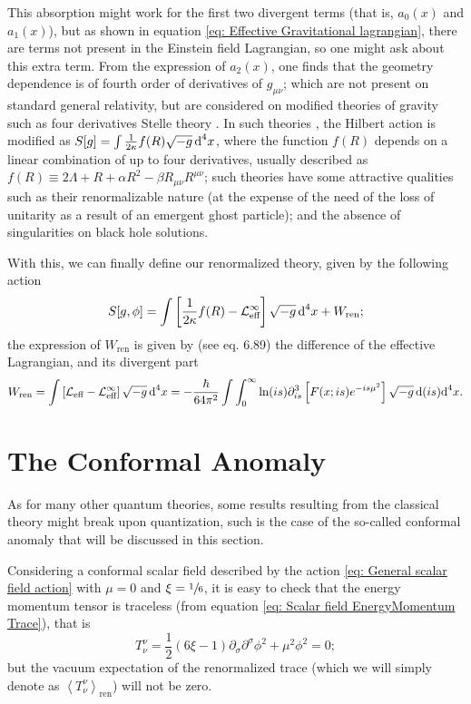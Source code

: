 This absorption might work for the first two divergent terms (that is, $a_0(x)$ and $a_1(x)$), but as shown in equation \ref{eq: Effective Gravitational lagrangian}, there are terms not present in the Einstein field Lagrangian, so one might ask about this extra term. From the expression of $a_2(x)$, one finds that the geometry dependence is of fourth order of derivatives of $g_{\mu\nu}$; which are not present on standard general relativity, but are considered on modified theories of gravity such as four derivatives Stelle theory \cite{Stelle_1978}. In such theories \cite{TFG_Miguel}, the Hilbert action is modified as $S[g]=\int\frac{1}{2\kappa}f(R)\sqrt{-g}\,\text{d}^4x$, where the function $f(R)$ depends on a linear combination of up to four derivatives, usually described as $f(R)\equiv 2\Lambda+R+\alpha R^2-\beta R_{\mu\nu}R^{\mu\nu}$; such theories have some attractive qualities such as their renormalizable nature (at the expense of the need of the loss of unitarity as a result of an emergent ghost particle); and the absence of singularities on black hole solutions.

With this, we can finally define our renormalized theory, given by the following action
\begin{equation}
	S[g,\phi]=\int\left[\frac{1}{2\kappa}f(R)-\mathcal{L}_{\text{eff}}^\infty\right]\sqrt{-g}\,\text{d}^4x+ W_{\text{ren}};
\end{equation}
the expression of $W_{\text{ren}}$ is given by (see \cite{BirrelDavies} eq. 6.89) the difference of the effective Lagrangian, and its divergent part
\begin{equation}
	W_{\text{ren}}=\int\left[\mathcal{L}_{\text{eff}}-\mathcal{L}_{\text{eff}}^{\infty}\right]\sqrt{-g}\,\text{d}^4 x=-\frac{\hbar}{64\pi^2}\int\int_{0}^\infty\ln(is)\partial_{is}^3\left[F(x;is)e^{-is\mu^2}\right]\sqrt{-g}\,\text{d}(is)\text{d}^4x.
\end{equation}
\section{The Conformal Anomaly}
As for many other quantum theories, some results resulting from the classical theory might break upon quantization, such is the case of the so-called conformal anomaly that will be discussed in this section.

Considering a conformal scalar field described by the action \ref{eq: General scalar field action} with $\mu=0$ and $\xi=\sfrac{1}{6}$, it is easy to check that the energy momentum tensor is traceless (from equation \ref{eq: Scalar field EnergyMomentum Trace}), that is
\begin{equation}
	T_\nu^\nu=\frac{1}{2}\left(6\xi-1\right)\partial_\sigma\partial^\sigma\phi^2+\mu^2\phi^2=0;
\end{equation}
but the vacuum expectation of the renormalized trace (which we will simply denote as $\left\langle T^\nu_\nu\right\rangle_{\text{ren}}$) will not be zero.


